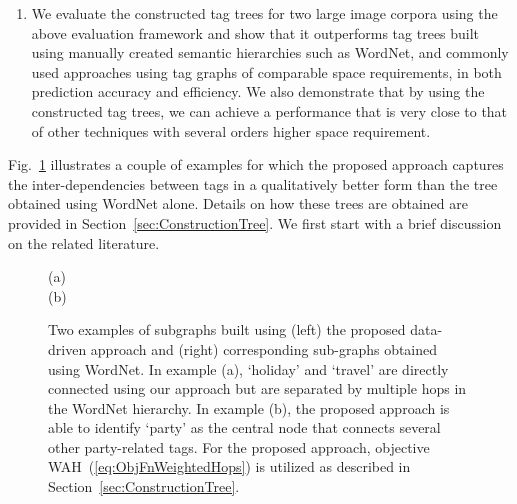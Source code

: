 {\begin{enumerate}
{}
    \item We evaluate the constructed tag trees for two large image corpora using the above evaluation framework and show that it outperforms tag trees built using manually created semantic hierarchies such as WordNet, and commonly used approaches using tag graphs of comparable space requirements, in both prediction accuracy and efficiency. We also demonstrate that by using the constructed tag trees, we can achieve a performance that is very close to that of other techniques with several orders higher space requirement. 
\end{enumerate}

}


\indent Fig.~\ref{fig:todo} illustrates a couple of examples for which the proposed approach captures the inter-dependencies between tags in a qualitatively better form than the tree obtained using WordNet alone. Details on how these trees are obtained are provided in Section~\ref{sec:ConstructionTree}. We first start with a brief discussion on the related literature.
\begin{figure}
\centering
(a)
\hspace{0.05cm}
\vline
\hspace{0.05cm}
\vspace{0.25cm}
\\
(b)
\hspace{0.01cm}
\vline
\hspace{0.05cm}
\caption{Two examples of subgraphs built using (left) the proposed data-driven approach and (right) corresponding sub-graphs obtained using WordNet. In example (a), `holiday' and `travel' are directly connected using our approach but are separated by multiple hops in the WordNet hierarchy. In example (b), the proposed approach is able to identify `party' as the central node that connects several other party-related tags. For the proposed approach, objective WAH~(\ref{eq:ObjFnWeightedHops}) is utilized as described in Section~\ref{sec:ConstructionTree}.}
\label{fig:todo}
\end{figure}
